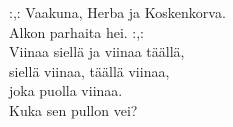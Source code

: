 
:,: Vaakuna, Herba ja Koskenkorva. \\ Alkon parhaita hei. :,: \\ Viinaa siellä ja viinaa täällä, \\ siellä viinaa, täällä viinaa, \\ joka puolla viinaa. \\ Kuka sen pullon vei?